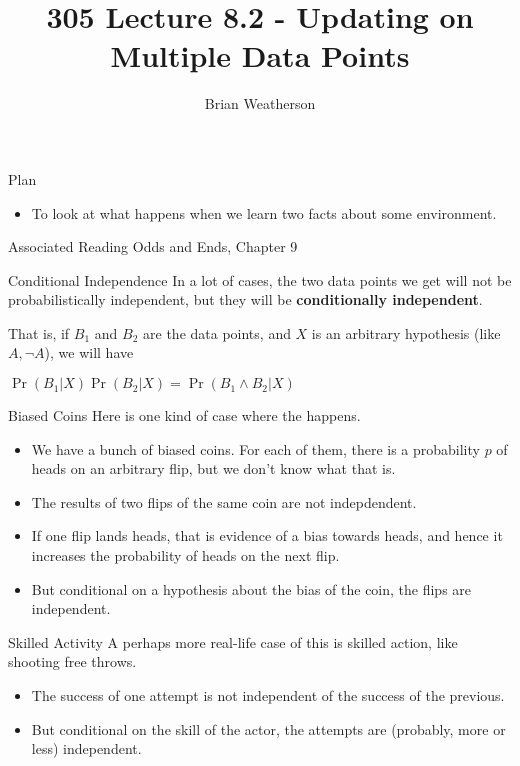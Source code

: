 \documentclass[
  ignorenonframetext,
]{beamer}
\title{305 Lecture 8.2 - Updating on Multiple Data Points}
\author{Brian Weatherson}
\date{}
\providecommand{\tightlist}{%
  \setlength{\itemsep}{0pt}\setlength{\parskip}{0pt}}
\renewcommand{\,}{\text{, }}
\renewenvironment*{quote}	
	{\list{}{\rightmargin   \leftmargin} \item } 	
	{\endlist }
\begin{document}
\frame{\titlepage}

\begin{frame}{Plan}
\protect\hypertarget{plan}{}
\begin{itemize}
\tightlist
\item
  To look at what happens when we learn two facts about some
  environment.
\end{itemize}
\end{frame}

\begin{frame}{Associated Reading}
\protect\hypertarget{associated-reading}{}
Odds and Ends, Chapter 9
\end{frame}

\begin{frame}{Conditional Independence}
\protect\hypertarget{conditional-independence}{}
In a lot of cases, the two data points we get will not be
probabilistically independent, but they will be \textbf{conditionally
independent}.

That is, if \(B_1\) and \(B_2\) are the data points, and \(X\) is an
arbitrary hypothesis (like \(A, \neg A\)), we will have

\begin{quote}
\(\Pr(B_1 | X)\Pr(B_2 | X) = \Pr(B_1 \wedge B_2 | X)\)
\end{quote}
\end{frame}

\begin{frame}{Biased Coins}
\protect\hypertarget{biased-coins}{}
Here is one kind of case where the happens.

\begin{itemize}
\tightlist
\item
  We have a bunch of biased coins. For each of them, there is a
  probability \(p\) of heads on an arbitrary flip, but we don't know
  what that is. \pause
\item
  The results of two flips of the same coin are not indepdendent.
\item
  If one flip lands heads, that is evidence of a bias towards heads, and
  hence it increases the probability of heads on the next flip. \pause
\item
  But conditional on a hypothesis about the bias of the coin, the flips
  are independent.
\end{itemize}
\end{frame}

\begin{frame}{Skilled Activity}
\protect\hypertarget{skilled-activity}{}
A perhaps more real-life case of this is skilled action, like shooting
free throws.

\begin{itemize}
\tightlist
\item
  The success of one attempt is not independent of the success of the
  previous.
\item
  But conditional on the skill of the actor, the attempts are (probably,
  more or less) independent.
\end{itemize}
\end{frame}
\end{document}
